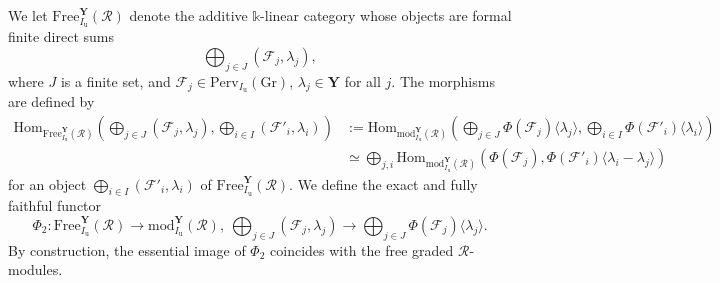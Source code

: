 \documentclass[11pt]{amsart}
\theoremstyle{plain}
\theoremstyle{remark}
\numberwithin{equation}{section}
\begin{document}
	We let $\mathrm{Free}^\mathbf{Y}_{I_\mathrm{u}}(\mathcal{R})$ denote the additive $\mathbb{k}$-linear category whose objects are formal finite direct sums
	$$\bigoplus_{j\in J} (\mathcal{F}_j,\lambda_j), $$
	where $J$ is a finite set, and $\mathcal{F}_j\in\mathrm{Perv}_{I_\mathrm{u}}(\mathrm{Gr})$, $\lambda_j\in\mathbf{Y}$ for all $j$. The morphisms are defined by
	\begin{align*}
		\mathrm{Hom}_{\mathrm{Free}^\mathbf{Y}_{I_\mathrm{u}}(\mathcal{R})}(\bigoplus_{j\in J} (\mathcal{F}_j,\lambda_j),\bigoplus_{i\in I} (\mathcal{F}'_i,\lambda_i))&:=\mathrm{Hom}_{\mathrm{mod}^\mathbf{Y}_{I_\mathrm{u}}(\mathcal{R})}(\bigoplus_{j\in J} \Phi(\mathcal{F}_j)\langle\lambda_j\rangle,\bigoplus_{i\in I} \Phi(\mathcal{F}'_i)\langle\lambda_i\rangle)\\
		&\simeq \bigoplus_{j,i}\mathrm{Hom}_{\mathrm{mod}^\mathbf{Y}_{I_\mathrm{u}}(\mathcal{R})}( \Phi(\mathcal{F}_j), \Phi(\mathcal{F}'_i)\langle\lambda_i-\lambda_j\rangle)
	\end{align*}
	for an object $\bigoplus_{i\in I} (\mathcal{F}'_i,\lambda_i)$ of $\mathrm{Free}^\mathbf{Y}_{I_\mathrm{u}}(\mathcal{R})$. We define the exact and fully faithful functor 
	$$\Phi_2:\mathrm{Free}^\mathbf{Y}_{I_\mathrm{u}}(\mathcal{R})\to  \mathrm{mod}^\mathbf{Y}_{I_\mathrm{u}}(\mathcal{R}),~\bigoplus_{j\in J} (\mathcal{F}_j,\lambda_j)\to \bigoplus_{j\in J} \Phi(\mathcal{F}_j)\langle\lambda_j\rangle.$$
	By construction, the essential image of $\Phi_2$ coincides with the free graded $\mathcal{R}$-modules.
	
\end{document}
